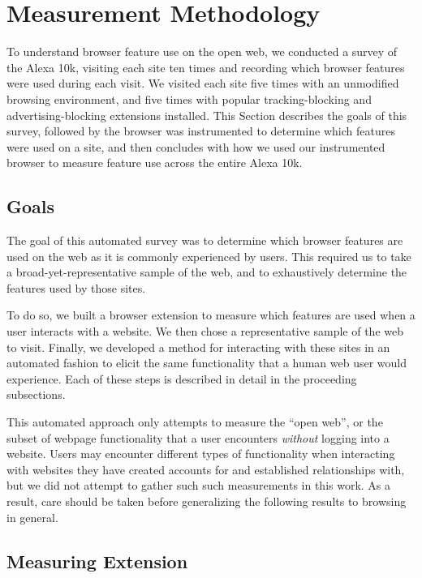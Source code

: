 \section{Measurement Methodology}
\label{measurement:methodology}

To understand browser feature use on the open web, we conducted a survey of the
Alexa 10k, visiting each site ten times and recording which browser features
were used during each visit.  We visited each site five times with an
unmodified browsing environment, and five times with popular tracking-blocking
and advertising-blocking extensions installed.  This Section describes the
goals of this survey, followed by the browser was instrumented to determine
which features were used on a site, and then concludes with how we used
our instrumented browser to measure feature use across the entire Alexa 10k.


\subsection{Goals}
The goal of this automated survey was to determine which browser features
are used on the web as it is commonly experienced by users.  This required us
to take a broad-yet-representative sample of the web, and to exhaustively
determine the features used by those sites.

To do so, we built a browser extension to measure which features are used when
a user interacts with a website.  We then chose a representative sample of the
web to visit.  Finally, we developed a method for interacting with these sites
in an automated fashion to elicit the same functionality that a human web user
would experience.  Each of these steps is described in detail in the proceeding
subsections.

This automated approach only attempts to measure the ``open web'', or the
subset of webpage functionality that a user encounters \textit{without} logging
into a website.  Users may encounter different types of functionality when
interacting with websites they have created accounts for and established
relationships with, but we did not attempt to gather such such measurements in
this work.  As a result, care should be taken before generalizing the following
results to browsing in general.


\subsection{Measuring Extension}
\label{measurement:methodology:measureextension}

